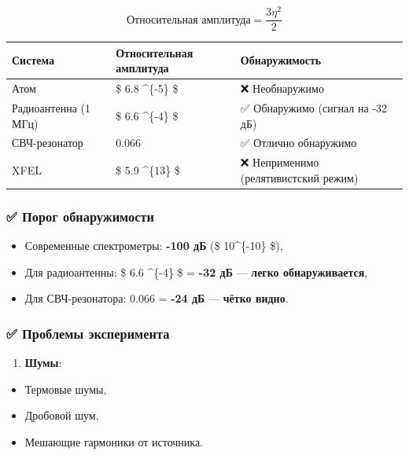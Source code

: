\documentclass[11pt]{article}
\providecommand{\tightlist}{%
      \setlength{\itemsep}{0pt}\setlength{\parskip}{0pt}}
\begin{document}
\[
\text{Относительная амплитуда} = \frac{3\eta^2}{2}
\]

\begin{longtable}[]{@{}lll@{}}
\toprule
Система & Относительная амплитуда & Обнаружимость\tabularnewline
\midrule
\endhead
Атом & \$ 6.8 \times 10\^{}\{-5\} \$ & ❌ Необнаружимо\tabularnewline
Радиоантенна (1 МГц) & \$ 6.6 \times 10\^{}\{-4\} \$ & ✅ Обнаружимо
(сигнал на -32 дБ)\tabularnewline
СВЧ-резонатор & 0.066 & ✅ Отлично обнаружимо\tabularnewline
XFEL & \$ 5.9 \times 10\^{}\{13\} \$ & ❌ Неприменимо (релятивистский
режим)\tabularnewline
\bottomrule
\end{longtable}

\subsubsection{✅ Порог
обнаружимости}\label{ux43fux43eux440ux43eux433-ux43eux431ux43dux430ux440ux443ux436ux438ux43cux43eux441ux442ux438}

\begin{itemize}
\tightlist
\item
  Современные спектрометры: \textbf{-100 дБ} (\$ 10\^{}\{-10\} \$),
\item
  Для радиоантенны: \$ 6.6 \^{}\{-4\} \$ = \textbf{-32 дБ} ---
  \textbf{легко обнаруживается},
\item
  Для СВЧ-резонатора: 0.066 = \textbf{-24 дБ} --- \textbf{чётко видно}.
\end{itemize}

\subsubsection{✅ Проблемы
эксперимента}\label{ux43fux440ux43eux431ux43bux435ux43cux44b-ux44dux43aux441ux43fux435ux440ux438ux43cux435ux43dux442ux430}

\begin{enumerate}
\def\labelenumi{\arabic{enumi}.}
\tightlist
\item
  \textbf{Шумы}:\\
\end{enumerate}

\begin{itemize}
\tightlist
\item
  Термовые шумы,\\
\item
  Дробовой шум,\\
\item
  Мешающие гармоники от источника.
\end{itemize}
\end{document}
